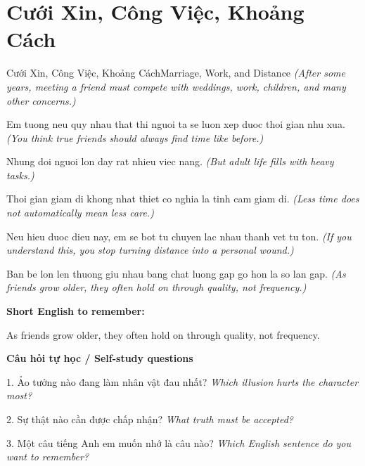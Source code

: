 \section{Cưới Xin, Công Việc, Khoảng Cách}
\begin{truyen}{Cưới Xin, Công Việc, Khoảng Cách}{Marriage, Work, and Distance}
\textit{(After some years, meeting a friend must compete with weddings, work, children, and many other concerns.)}

Em tuong neu quy nhau that thi nguoi ta se luon xep duoc thoi gian nhu xua.
\textit{(You think true friends should always find time like before.)}

Nhung doi nguoi lon day rat nhieu viec nang.
\textit{(But adult life fills with heavy tasks.)}

Thoi gian giam di khong nhat thiet co nghia la tinh cam giam di.
\textit{(Less time does not automatically mean less care.)}

Neu hieu duoc dieu nay, em se bot tu chuyen lac nhau thanh vet tu ton.
\textit{(If you understand this, you stop turning distance into a personal wound.)}

\end{truyen}

\begin{baihoc}
Ban be lon len thuong giu nhau bang chat luong gap go hon la so lan gap.
\textit{(As friends grow older, they often hold on through quality, not frequency.)}
\end{baihoc}

\begin{ghinhoanh}
\textbf{Short English to remember:}

As friends grow older, they often hold on through quality, not frequency.

\end{ghinhoanh}

\begin{tuhocnhanh}
\textbf{Câu hỏi tự học / Self-study questions}

1. Ảo tưởng nào đang làm nhân vật đau nhất? \textit{Which illusion hurts the character most?}

2. Sự thật nào cần được chấp nhận? \textit{What truth must be accepted?}

3. Một câu tiếng Anh em muốn nhớ là câu nào? \textit{Which English sentence do you want to remember?}
\end{tuhocnhanh}
\ngancach

